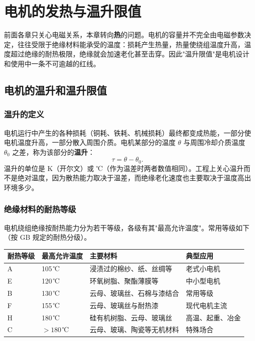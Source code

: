 \chapter{电机的发热与温升限值}

前面各章只关心电磁关系，本章转向\textbf{热}的问题。电机的容量并不完全由电磁参数决定，往往受限于绝缘材料能承受的温度：损耗产生热量，热量使绕组温度升高，温度超过绝缘的耐热极限，绝缘就会加速老化甚至击穿。因此"温升限值"是电机设计和使用中一条不可逾越的红线。

\section{电机的温升和温升限值}

\subsection{温升的定义}
电机运行中产生的各种损耗（铜耗、铁耗、机械损耗）最终都变成热能，一部分使电机温度升高，一部分散入周围介质。电机某部分的温度 $\theta$ 与周围冷却介质温度 $\theta_0$ 之差，称为该部分的\textbf{温升}：
\begin{equation}
\tau=\theta-\theta_0 .
\end{equation}
温升的单位是 K（开尔文）或 ℃（作为温差时两者数值相同）。工程上关心温升而不是绝对温度，因为散热能力取决于温差，而绝缘老化速度也主要取决于温度高出环境多少。

\subsection{绝缘材料的耐热等级}
电机绕组绝缘按耐热能力分为若干等级，各级有其"最高允许温度"。常用等级如下（按 GB 规定的耐热分级）。

\begin{center}
\begin{tabular}{@{}llll@{}}
\toprule
耐热等级 & 最高允许温度 & 主要材料 & 典型应用 \\
\midrule
A & 105\,℃ & 浸渍过的棉纱、纸、丝绸等 & 老式小电机 \\
E & 120\,℃ & 环氧树脂、聚酯薄膜等 & 中小型电机 \\
B & 130\,℃ & 云母、玻璃丝、石棉与漆结合 & 常用等级 \\
F & 155\,℃ & 云母、玻璃丝与耐热漆 & 现代电机主流 \\
H & 180\,℃ & 硅有机树脂、云母、玻璃丝 & 高温、起重、冶金 \\
C & $>180$\,℃ & 云母、玻璃、陶瓷等无机材料 & 特殊场合 \\
\bottomrule
\end{tabular}
\end{center}


